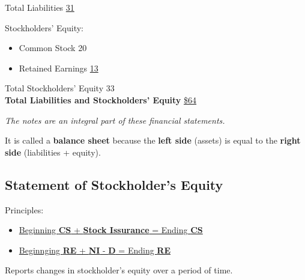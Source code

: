 \begin{tcolorbox}[colframe=black,colback=white,title=Example Balance Sheet (Classified by Current \& Non-current)]
\begin{multicols}{2}
        Total Liabilities \hfill \underline{31}

        Stockholders' Equity:
        \begin{itemize}
            \item Common Stock \hfill 20
            \item Retained Earnings \hfill \underline{13}
        \end{itemize}
        Total Stockholders' Equity \hfill 33\\
        {\textbf{Total Liabilities and Stockholders' Equity}} \hfill \underline{\underline{\$64}}
    \end{multicols}

    \vspace{1em}

    \textit{\footnotesize{The notes are an integral part of these financial statements.}}
\end{tcolorbox}

\normalsize

It is called a \textbf{balance sheet} because the \textbf{left side} (assets) is equal to the \textbf{right side} (liabilities + equity).

\newpage

\subsection{Statement of Stockholder's Equity}
\label{sec:statement_se}

Principles:

\begin{itemize}
    \item \hyperref[def:sale_of_stock]{Beginning \textbf{CS} + \textbf{Stock Issurance} = Ending \textbf{CS}}
    \item \hyperref[thm:relations]{Beginnging \textbf{RE} + \textbf{NI} - \textbf{D} = Ending \textbf{RE}}
\end{itemize}


Reports changes in stockholder's equity over a period of time.

\small

